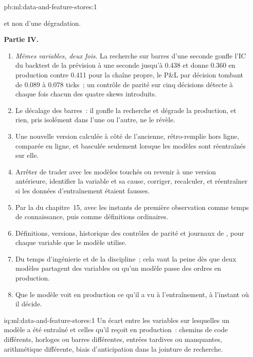 \begin{solution}{pb:ml:data-and-feature-stores:1}
\begin{enumerate}[resume]
et non d'une dégradation.
\end{enumerate}
\textbf{Partie IV.}
\begin{enumerate}[resume]
\item \emph{Mêmes variables, deux fois.} La recherche sur barres d'une seconde gonfle l'IC du backtest de la prévision à une seconde jusqu'à 0.438 et
donne 0.360 en production contre 0.411 pour la chaîne propre, le P\&L par décision tombant de 0.089 à 0.078 ticks~; un
contrôle de parité sur cinq décisions détecte à chaque fois chacun des quatre skews introduits.
\item Le décalage des barres~: il gonfle la recherche et dégrade la production, et rien, pris isolément dans l'une ou l'autre, ne le révèle.
\item Une nouvelle version calculée à côté de l'ancienne, rétro-remplie hors ligne, comparée en ligne, et basculée seulement lorsque les modèles sont
réentraînés sur elle.
\item Arrêter de trader avec les modèles touchés ou revenir à une version antérieure, identifier la variable et sa cause, corriger, recalculer, et réentraîner si les
données d'entraînement étaient fausses.
\item Par la  du chapitre~15, avec les instants de première observation comme temps de connaissance, puis comme définitions ordinaires.
\item Définitions, versions, historique des contrôles de parité et journaux de , pour chaque variable que le modèle utilise.
\item Du temps d'ingénierie et de la discipline~; cela vaut la peine dès que deux modèles partagent des variables ou qu'un modèle passe des ordres en production.
\item Que le modèle voit en production ce qu'il a vu à l'entraînement, à l'instant où il décide.
\end{enumerate}
\end{solution}

\begin{solution}{iq:ml:data-and-feature-stores:1}
Un écart entre les variables sur lesquelles un modèle a été entraîné et celles qu'il reçoit en production~: chemins de code différents, horloges ou barres différentes,
entrées tardives ou manquantes, arithmétique différente, biais d'anticipation dans la jointure de recherche.
\end{solution}

